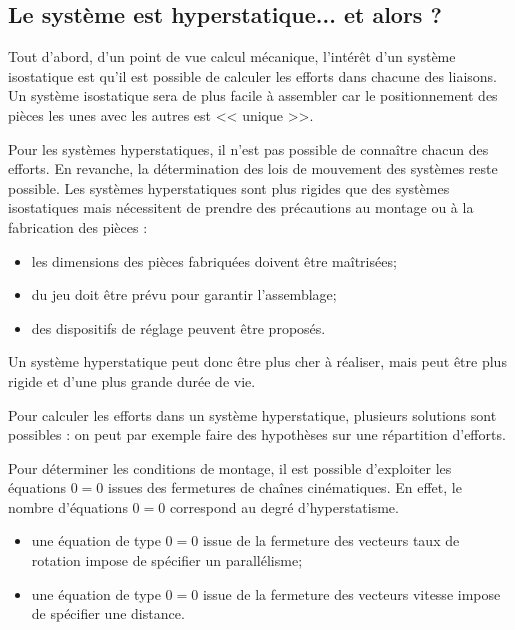\documentclass[10pt,fleqn]{article} %
\begin{document}
\subsection{Le système est hyperstatique... et alors ?}

Tout d'abord, d'un point de vue calcul mécanique, l'intérêt d'un système isostatique est qu'il est possible de calculer les efforts dans chacune des liaisons. Un système isostatique sera de plus facile à assembler car le positionnement des pièces les unes avec les autres est << unique >>. 

Pour les systèmes hyperstatiques, il n'est pas possible de connaître chacun des efforts. En revanche, la détermination des lois de mouvement des systèmes reste possible. Les systèmes hyperstatiques sont plus rigides que des systèmes isostatiques mais nécessitent de prendre des précautions au montage ou à la fabrication des pièces : 
\begin{itemize}
 \item les dimensions des pièces fabriquées doivent être maîtrisées;
 \item du jeu doit être prévu pour garantir l'assemblage;
 \item des dispositifs de réglage peuvent être proposés.
\end{itemize}

Un système hyperstatique peut donc être plus cher à réaliser, mais peut être plus rigide et d'une plus grande durée de vie. 

Pour calculer les efforts dans un système hyperstatique, plusieurs solutions sont possibles : on peut par exemple faire des hypothèses sur une répartition d'efforts. 


\begin{methode}
Pour déterminer les conditions de montage, il est possible d'exploiter les équations $0=0$ issues des fermetures de chaînes cinématiques.  En effet, le nombre d'équations $0=0$ correspond  au degré d'hyperstatisme.
\begin{itemize}
\item une équation de type $0=0$ issue de la fermeture des vecteurs taux de rotation impose de spécifier un parallélisme;
\item une équation de type $0=0$ issue de la fermeture des vecteurs vitesse impose de spécifier une distance.
\end{itemize}
\end{methode}
\end{document}

